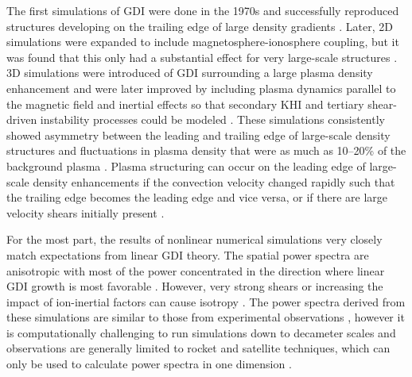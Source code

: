 The first simulations of GDI were done in the 1970s and successfully reproduced structures developing on the trailing edge of large density gradients \citep{Zabusky1973,Doles1976,Scannapieco1976,Ossakow1975,Ossakow1977}.  Later, 2D simulations were expanded to include magnetosphere-ionosphere coupling, but it was found that this only had a substantial effect for very large-scale structures \citep{Keskinen1990}.  3D simulations were introduced of GDI surrounding a large plasma density enhancement \citep{Guzdar1998} and were later improved by including plasma dynamics parallel to the magnetic field and inertial effects so that secondary KHI and tertiary shear-driven instability processes could be modeled \citep{Gondarenko1999}.  These simulations consistently showed asymmetry between the leading and trailing edge of large-scale density structures and fluctuations in plasma density that were as much as 10--20\% of the background plasma \citep{Gondarenko2004a,Gondarenko2004b}.  Plasma structuring can occur on the leading edge of large-scale density enhancements if the convection velocity changed rapidly such that the trailing edge becomes the leading edge and vice versa, or if there are large velocity shears initially present \citep{Gondarenko2004a,Gondarenko2004b}.

For the most part, the results of nonlinear numerical simulations very closely match expectations from linear GDI theory.  The spatial power spectra are anisotropic with most of the power concentrated in the direction where linear GDI growth is most favorable \citep{Keskinen1981a,Keskinen1981b,Keskinen1982a,Gondarenko2001,Gondarenko2004b}.  However, very strong shears or increasing the impact of ion-inertial factors can cause isotropy \citep{Gondarenko2001,Gondarenko2006}.  The power spectra derived from these simulations are similar to those from experimental observations \citep{Baker1978,Kelley1979}, however it is computationally challenging to run simulations down to decameter scales and observations are generally limited to rocket and satellite techniques, which can only be used to calculate power spectra in one dimension \citep{Villain1986,Moen2012}.


